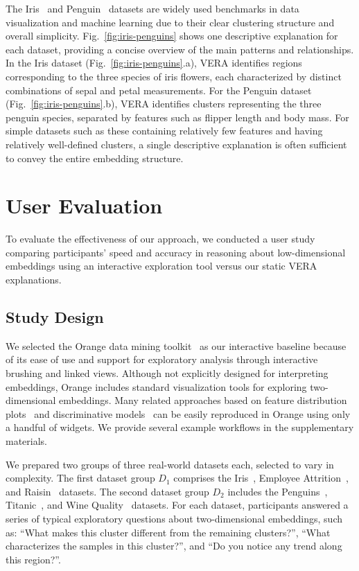 \documentclass[lettersize,journal]{IEEEtran}
\begin{document}
The Iris~\cite{Anderson1936} and Penguin~\cite{Horst2020} datasets are widely used benchmarks in data visualization and machine learning due to their clear clustering structure and overall simplicity.
Fig.~\ref{fig:iris-penguins} shows one descriptive explanation for each dataset, providing a concise overview of the main patterns and relationships.
In the Iris dataset (Fig.~\ref{fig:iris-penguins}.a), VERA identifies regions corresponding to the three species of iris flowers, each characterized by distinct combinations of sepal and petal measurements. For the Penguin dataset (Fig.~\ref{fig:iris-penguins}.b), VERA identifies clusters representing the three penguin species, separated by features such as flipper length and body mass.
For simple datasets such as these containing relatively few features and having relatively well-defined clusters, a single descriptive explanation is often sufficient to convey the entire embedding structure.


\section{User Evaluation}
\label{sec:user-study}

To evaluate the effectiveness of our approach, we conducted a user study comparing participants' speed and accuracy in reasoning about low-dimensional embeddings using an interactive exploration tool versus our static VERA explanations.

\subsection{Study Design}
\label{sec:user-study:design}

We selected the Orange data mining toolkit~\cite{Demsar2013} as our interactive baseline because of its ease of use and support for exploratory analysis through interactive brushing and linked views.
Although not explicitly designed for interpreting embeddings, Orange includes standard visualization tools for exploring two-dimensional embeddings. Many related approaches based on feature distribution plots~\cite{Stahnke2016,Eckelt2022} and discriminative models~\cite{Bibal2021,Marcilio2021} can be easily reproduced in Orange using only a handful of widgets. We provide several example workflows in the supplementary materials.

We prepared two groups of three real-world datasets each, selected to vary in complexity.
The first dataset group $D_1$ comprises the Iris~\cite{Anderson1936}, Employee Attrition~\cite{IbmEmployeeAttrition}, and Raisin~\cite{RaisinDataset} datasets. The second dataset group $D_2$ includes the Penguins~\cite{Horst2020}, Titanic~\cite{Dawson1995}, and Wine Quality~\cite{Cortez2009} datasets. For each dataset, participants answered a series of typical exploratory questions about two-dimensional embeddings, such as: ``What makes this cluster different from the remaining clusters?'', ``What characterizes the samples in this cluster?'', and ``Do you notice any trend along this region?''.
\end{document}
